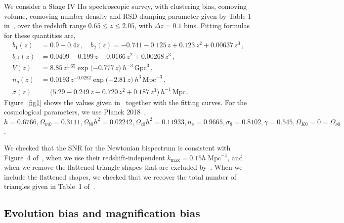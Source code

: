 %
We consider a Stage IV H$\alpha$ spectroscopic survey, with clustering bias, comoving volume, comoving number density and RSD damping parameter given by Table 1 in~\cite{Yankelevich:2018uaz}, over the redshift range $0.65\leq z\leq 2.05$, with $\Delta z=0.1$ bins. 
Fitting formulas for these quantities are, 
\begin{align}
b_1(z) &= 0.9+0.4 z\,, \quad b_2(z) = -0.741 - 0.125\,z + 0.123\,z^{2} + 0.00637\,z^{3}\,, \label{e9}  \\
 b_{s^2}(z) &= 0.0409 - 0.199\,z - 0.0166\,z^{2} + 0.00268\,z^{3} \,, \label{e11} \\
 V(z) &= 8.85\, z^{1.65}\exp\big({-0.777\,z}\big)~ h^{-3}\,\mathrm{Gpc}^{3}\,, \label{e11_1} \\
n_{g}(z) &= 0.0193\, z^{-0.0282}\exp\big({-2.81\,z}\big) ~h^{3}\,\mathrm{Mpc}^{-3}\,,
 \label{e11_2}\\
\sigma(z)& = \big(5.29 - 0.249\,z - 0.720\,z^{2} + 0.187\,z^{3}\big)~h^{-1}\,\mathrm{Mpc}\,. \label{e14a}
\end{align}
Figure~\ref{fig1} shows the values given in~\cite{Yankelevich:2018uaz} together with the fitting curves. For the cosmological parameters, we use Planck 2018~\cite{Aghanim:2018eyx},
$h = 0.6766, \Omega_{m0} = 0.3111,
\Omega_{b0}h^{2}= 0.02242,
\Omega_{c0} h^{2} = 0.11933,
n_s = 0.9665,
\sigma_8 = 0.8102, \gamma=0.545,
\Omega_{K0} = 0= \Omega_{\nu 0}$.

We checked that the SNR for the Newtonian bispectrum is consistent with Figure~4 of~\cite{Yankelevich:2018uaz}, when we use their redshift-independent $k_{\mathrm{max}} = 0.15h\;\mathrm{Mpc}^{-1}$, and when we remove the flattened triangle shapes that are excluded by~\cite{Yankelevich:2018uaz}. When we include the flattened shapes, we checked that we recover the total number of triangles given in Table~1 of~\cite{Oddo:2019run}.
%
%
\subsection{Evolution bias and magnification bias}

